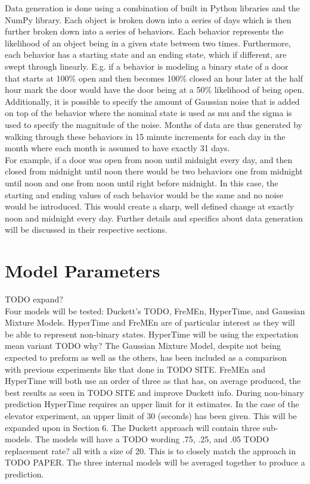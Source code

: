   Data generation is done using a combination of built in Python libraries and
  the NumPy library. Each object is broken down into a series of days which is
  then further broken down into a series of behaviors. Each behavior
  represents the likelihood of an object being in a given state between two
  times.  Furthermore, each behavior has a starting state and an ending state,
  which if different, are swept through linearly. E.g. if a behavior is
  modeling a binary state of a door that starts at 100\% open and then becomes
  100\% closed an hour later at the half hour mark the door would have the
  door being at a 50\% likelihood of being open. Additionally, it is possible
  to specify the amount of Gaussian noise that is added on top of the
  behavior where the nominal state is used as mu and the sigma is used to
  specify the magnitude of the noise. Months of data are thus generated by
  walking through these behaviors in 15 minute increments for each day in the
  month where each month is assumed to have exactly 31 days. \\

  For example, if a door was open from noon until midnight every day, and then closed from
  midnight until noon there would be two behaviors one from midnight until
  noon and one from noon until right before midnight. In this case, the
  starting and ending values of each behavior would be the same and no noise
  would be introduced. This would create a sharp, well defined change at
  exactly noon and midnight every day. Further details and specifics about data
  generation will be discussed in their respective sections. \\

  \section{ Model Parameters }
  TODO expand? \\

  Four models will be tested: Duckett's TODO, FreMEn, HyperTime, and Gaussian
  Mixture Models. HyperTime and FreMEn are of particular interest as they will
  be able to represent non-binary states. HyperTime will be using the
  expectation mean variant TODO why? The Gaussian Mixture Model, despite not
  being expected to preform as well as the others, has been included as a
  comparison with previous experiments like that done in TODO SITE. FreMEn and
  HyperTime will both use an order of three as that has, on average produced,
  the best results as seen in TODO SITE and improve Duckett info. During
  non-binary prediction HyperTime requires an upper limit for it estimates. In
  the case of the elevator experiment, an upper limit of 30 (seconds) has been
  given. This will be expanded upon in Section 6. The Duckett approach will
  contain three sub-models. The models will have a TODO wording .75, .25, and
  .05 TODO replacement rate? all with a size of 20. This is to closely match
  the approach in TODO PAPER. The three internal models will be averaged
  together to produce a prediction.\\

